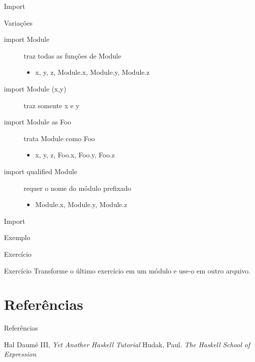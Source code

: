 \documentclass{beamer}
\begin{document}
			\begin{frame}[fragile]{Import}
			 \begin{block}{Variações}
			  \begin{description}
			   \item [import Module] traz todas as funções de Module
					\begin{itemize}
					 \item x, y, z, Module.x, Module.y, Module.z
					\end{itemize}
				 \item [import Module (x,y)] traz somente x e y
				 \item [import Module as Foo] trata Module como Foo
					\begin{itemize}
					 \item x, y, z, Foo.x, Foo.y, Foo.z
					\end{itemize}

			   \item [import qualified Module] requer o nome do módulo prefixado
					\begin{itemize}
					 \item Module.x, Module.y, Module.z
					\end{itemize}
			  \end{description}			  
			 \end{block}
			\end{frame}
			
			\begin{frame}[fragile]{Import}
			 \begin{block}{Exemplo}
			  
			 \end{block}
			\end{frame}
			
			\begin{frame}{Exercício}
			 \begin{block}{Exercício}
			  Transforme o último exercício em um módulo e use-o em outro arquivo.
			 \end{block}
			\end{frame}

			
\section{Referências}
\begin{frame}{Referências}
	\begin{thebibliography}{9}
	 Hal Daumé III, \textit{Yet Another Haskell Tutorial}
	 Hudak, Paul. \textit{The Haskell School of Expression}
	\end{thebibliography}
\end{frame}
	
	
\end{document}
